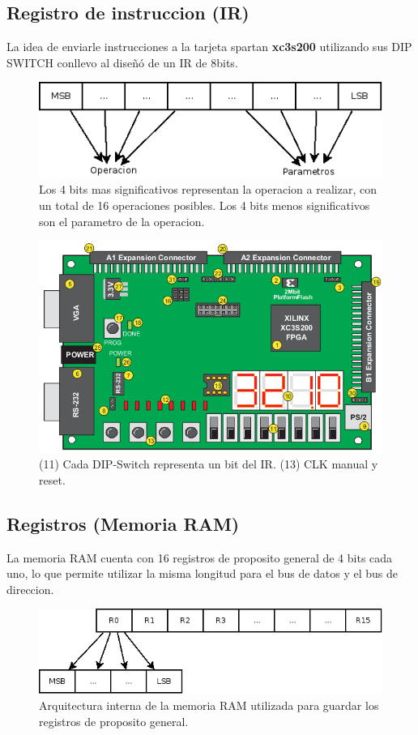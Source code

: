 \documentclass[11pt,letterpaper]{article} %
\begin{document}
\subsection{Registro de instruccion (IR)}
La idea de enviarle instrucciones a la tarjeta spartan \textbf{xc3s200}
utilizando sus DIP SWITCH conllevo al diseñó de un IR de 8bits.
\begin{figure}[H]
  \centering
  \includegraphics[width=12cm]{figures/instruccion.png}
  \caption{Los 4 bits mas significativos representan la operacion a realizar, con un total de 16 operaciones posibles. Los 4 bits menos significativos son el parametro de la operacion.}
\end{figure}
\begin{figure}[H]
  \centering
  \includegraphics[width=14cm]{figures/s3.png}
  \caption{(11) Cada DIP-Switch representa un bit del IR. (13) CLK manual y reset.}
\end{figure}

\subsection{Registros (Memoria RAM)}
\label{subsec:label}
La memoria RAM cuenta con 16 registros de proposito general de 4 bits cada uno,
lo que permite utilizar la misma longitud para el bus de datos y el bus de
direccion.\\
\begin{figure}[H]
  \centering
  \includegraphics[width=12cm]{figures/ram.png}
  \caption{Arquitectura interna de la memoria RAM utilizada para guardar los registros de proposito general.}
\end{figure}
\end{document}
